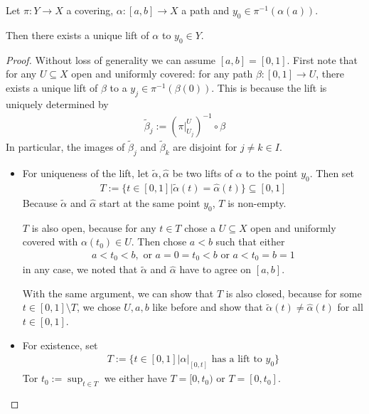 \begin{lem}[]\label{lem:path-lift}
  Let $\pi: Y \to X$ a covering, $\alpha:[a,b] \to X$ a path and $y_0 \in \pi^{-1}(\alpha(a))$.
  
  Then there exists a unique lift of $\alpha$ to $y_0 \in Y$.
\end{lem}
\begin{proof}
  Without loss of generality we can assume $[a,b] = [0,1]$.
  First note that for any $U \subseteq X$ open and uniformly covered: 
  for any path $\beta:[0,1] \to U$, there exists a unique lift of $\beta$ to a $y_j \in \pi^{-1}(\beta(0))$.
  This is because the lift is uniquely determined by
  \begin{align*}
    \tilde{\beta}_j := \left(
      \pi|_{U_j}^{U}
    \right)^{-1} \circ \beta
  \end{align*}
  In particular, the images of $\tilde{\beta}_j$ and $\tilde{\beta}_k$ are disjoint for $j \neq k \in I$.
  \begin{itemize}
    \item For uniqueness of the lift, let $\tilde{\alpha}, \hat{\alpha}$ be two lifts of $\alpha$ to the point $y_0$.
      Then set
      \begin{align*}
        T := \{t \in [0,1] \big\vert \tilde{\alpha}(t) = \hat{\alpha}(t)\} \subseteq [0,1]
      \end{align*}
      Because $\tilde{\alpha}$ and $\hat{\alpha}$ start at the same point $y_0$, $T$ is non-empty.

      $T$ is also open, because for any $t \in T$ chose a $U \subseteq X$ open and uniformly covered with $\alpha(t_0) \in U$.
      Then chose $a < b$ such that either
      \begin{align*}
        a < t_0 < b, \text{ or } a = 0 = t_0 < b \text{ or } a < t_0 = b = 1
      \end{align*}
      in any case, we noted that $\tilde{\alpha}$ and $\hat{\alpha}$ have to agree on $[a,b]$. 

      With the same argument, we can show that $T$ is also closed, because for some $t \in [0,1] \setminus T$, we chose $U,a,b$ like before and show that $\tilde{\alpha}(t) \neq \hat{\alpha}(t)$ for all $t \in [0,1]$.
    \item For existence, set
      \begin{align*}
        T := \{t \in [0,1] \big\vert \alpha|_{[0,t]} \text{ has a lift to $y_0$}\}
      \end{align*}
      Tor $t_0 := \sup_{t \in T}$ we either have $T = [0,t_0)$ or $T=[0,t_0]$.


\end{itemize}
\end{proof}
